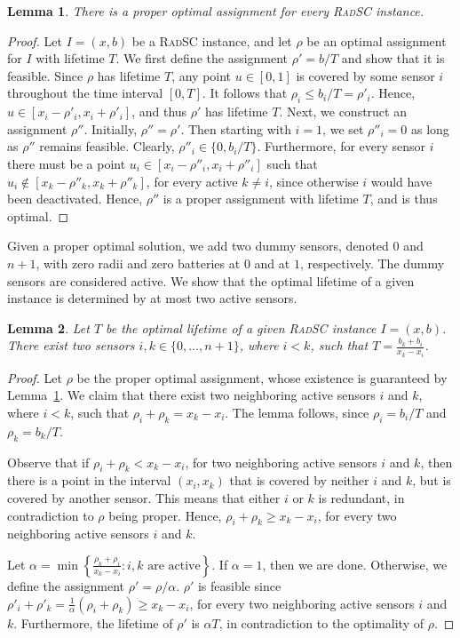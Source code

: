 \documentclass[11pt]{article}
\newtheorem{lemma}{Lemma}
\newcommand{\set}[1]{\left\{ #1 \right\}}
\newcommand{\srsc}{\textsc{RadSC}\xspace}
\begin{document}
\begin{lemma}
\label{lemma:proper}
There is
a proper optimal assignment for every \srsc instance.
\end{lemma}
\begin{proof}Let $I=(x,b)$ be a \srsc instance, and let $\rho$ be an optimal
assignment for $I$ with lifetime $T$.  We first define the assignment
$\rho' = b/T$ and show that it is feasible.  Since $\rho$ has lifetime
$T$, any point $u \in [0,1]$ is covered by some sensor $i$ throughout
the time interval $[0,T]$.  It follows that $\rho_i \leq b_i/T =
\rho'_i$.  Hence, $u \in [x_i-\rho'_i,x_i+\rho'_i]$, and thus $\rho'$
has lifetime $T$.
Next, we construct an assignment $\rho''$.  Initially, $\rho''=\rho'$.
Then starting with $i=1$, we set $\rho''_i=0$ as long as $\rho''$
remains feasible.  Clearly, $\rho''_i \in \{0,b_i/T\}$.  Furthermore,
for every sensor $i$ there must be a point $u_i \in
[x_i-\rho''_i,x_i+\rho''_i]$ such that $u_i \not\in
[x_k-\rho''_k,x_k+\rho''_k]$, for every active $k \neq i$, since
otherwise $i$ would have been deactivated.  Hence, $\rho''$ is a
proper assignment with lifetime $T$, and is thus optimal.
\end{proof}


Given a proper optimal solution, we add two dummy sensors, denoted $0$
and $n+1$, with zero radii and zero batteries at $0$ and at $1$,
respectively.  The dummy sensors are considered active.
We show that the optimal lifetime of a given instance is determined by
at most two active sensors.

\begin{lemma}
\label{lemma:pair}
Let $T$ be the optimal lifetime of a given \srsc instance $I=(x,b)$.
There exist two sensors $i, k \in \{0,\ldots,n+1\}$, where $i < k$,
such that $T = \frac{b_k+b_i}{x_k - x_i}$.
\end{lemma}
\begin{proof}Let $\rho$ be the proper optimal assignment, whose existence is
guaranteed by Lemma~\ref{lemma:proper}.  We claim that there exist two
neighboring active sensors $i$ and $k$, where $i<k$, such that $\rho_i
+ \rho_k = x_k - x_i$.  The lemma follows, since $\rho_i = b_i/T$ and
$\rho_k = b_k/T$.

Observe that if $\rho_i + \rho_k < x_k - x_i$, for two neighboring
active sensors $i$ and $k$, then there is a point in the interval
$(x_i,x_k)$ that is covered by neither $i$ and $k$, but is covered by
another sensor.  This means that either $i$ or $k$ is redundant, in
contradiction to $\rho$ being proper. Hence, $\rho_i + \rho_k \geq x_k
- x_i$, for every two neighboring active sensors $i$ and $k$.

Let $\alpha = \min \set{\frac{\rho_k + \rho_i}{x_k - x_i} : i, k
\text{ are active}}$.  If $\alpha = 1$, then we are done.  Otherwise,
we define the assignment $\rho' = \rho/\alpha$.  $\rho'$ is feasible
since $\rho'_i + \rho'_k = \frac{1}{\alpha} (\rho_i + \rho_k) \geq x_k
- x_i$, for every two neighboring active sensors $i$ and
$k$. Furthermore, the lifetime of $\rho'$ is $\alpha T$, in
contradiction to the optimality of $\rho$.
\end{proof}
\end{document}
